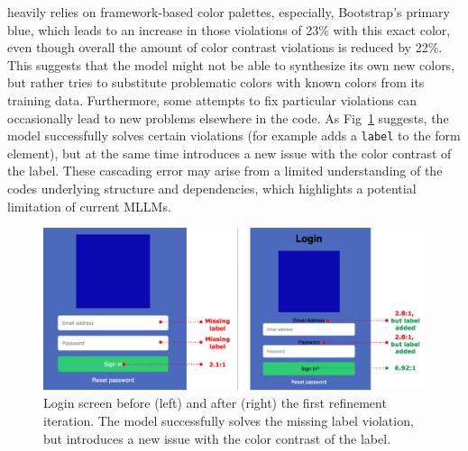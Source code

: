 heavily relies on framework-based color palettes, 
especially, Bootstrap's primary blue, which leads to 
an increase in those violations of 23\% with 
this exact color, even though overall the amount 
of color contrast violations is reduced by 22\%. 
This suggests that the model might not be able to 
synthesize its own new colors, but rather tries to
substitute problematic colors with known colors 
from its training data.
Furthermore, some
attempts to fix particular violations can 
occasionally lead to new problems elsewhere in 
the code. As Fig~\ref{fig:iterativecascadingissues} suggests, the model 
successfully solves certain violations (for example adds 
a \texttt{label} to the form element), but at the same time 
introduces a new issue with the color contrast of the label.
These cascading error may arise from a limited 
understanding of the codes underlying structure and 
dependencies, which highlights a potential limitation 
of current MLLMs.

\begin{figure}
  \centering
  \includegraphics[width=0.9\linewidth]{figures/iterativecascadingissues.png}
  \caption{Login screen before (left) and after (right) the first refinement iteration. The model successfully solves the missing label violation, but introduces a new issue with the color contrast of the label.}
  \label{fig:iterativecascadingissues} 
\end{figure}


